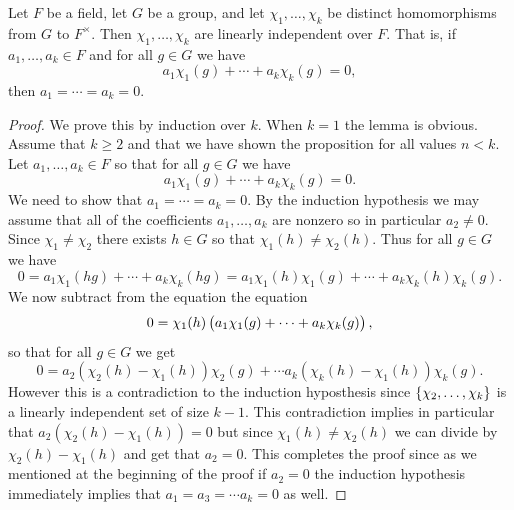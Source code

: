 \documentclass[11pt,a4paper]{article}
\begin{document}
\begin{lemma}
  Let $F$ be a field, let $G$ be a group, and
  let $\chi_1,\dots,\chi_k$ be distinct homomorphisms from $G$ to $F^{\times}$.
  Then $\chi_1,\dots,\chi_k$ are linearly independent over $F$.
  That is, if $a_1,\dots,a_k \in F$ and for all $g \in G$
  we have
  \[
    a_1 \chi_1(g) + \cdots + a_k \chi_k(g) = 0,
  \]
  then $a_1 = \cdots = a_k = 0$.
\end{lemma}
\begin{proof}
  We prove this by induction over $k$.
  When $k = 1$ the lemma is obvious.
  Assume that $k \geq 2$ and that we have shown the proposition
  for all values $n < k$.
  Let $a_1,\dots,a_k \in F$ so that for all $g \in G$
  we have
  \[
    a_1 \chi_1(g) + \cdots + a_k \chi_k(g) = 0.
  \]
  We need to show that $a_1 = \cdots = a_k = 0$.
  By the induction hypothesis we may assume that all of the coefficients
  $a_1,\dots,a_k$ are nonzero so in particular $a_2 \neq 0$.
  Since $\chi_1 \neq \chi_2$ there exists $h \in G$ so that
  $\chi_1(h) \neq \chi_2(h)$.
  Thus for all $g \in G$ we have
  \[
    0 = a_1 \chi_1(h g) + \cdots + a_k \chi_k(h g) =
    a_1 \chi_1(h)\chi_1(g) + \cdots + a_k \chi_k(h)\chi_k(g).
  \]
  We now subtract from the equation the equation
  \[
    0 = \chi_1(h)\del{a_1 \chi_1(g) + \cdots + a_k \chi_k(g)},
  \]
  so that for all $g \in G$ we get
  \[
    0 =
    a_2(\chi_2(h) - \chi_1(h)) \chi_2(g) + \cdots
    a_k(\chi_k(h) - \chi_1(h)) \chi_k(g).
  \]
  However this is a contradiction to the induction hyposthesis
  since $\left\{\chi_2,\dots,\chi_k\right\}$
  is a linearly independent set of size $k - 1$.
  This contradiction implies
  in particular that $a_2(\chi_2(h) - \chi_1(h)) = 0$
  but since $\chi_1(h) \neq \chi_2(h)$ we can divide
  by $\chi_2(h) - \chi_1(h)$ and get that $a_2 = 0$.
  This completes the proof since as we mentioned at the beginning of the
  proof if $a_2 = 0$ the induction hypothesis immediately implies that
  $a_1 = a_3 = \cdots a_k = 0$ as well.
\end{proof}
\end{document}
